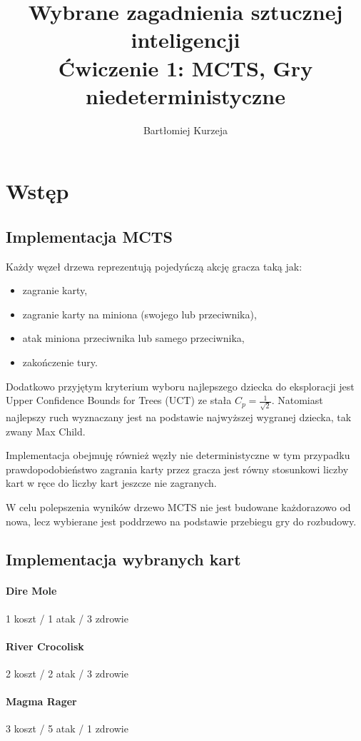 \documentclass[10pt,a4paper]{article}
\author{Bartłomiej Kurzeja}
\title{Wybrane zagadnienia sztucznej inteligencji \\ Ćwiczenie 1: MCTS, Gry niedeterministyczne}
\begin{document}
\maketitle
\section{Wstęp}
\subsection{Implementacja MCTS}
Każdy węzeł drzewa reprezentują pojedyńczą akcję gracza taką jak:
\begin{itemize}
	\item zagranie karty,
	\item zagranie karty na miniona (swojego lub przeciwnika),
	\item atak miniona przeciwnika lub samego przeciwnika,
	\item zakończenie tury. 
\end{itemize}

Dodatkowo przyjętym kryterium wyboru najlepszego dziecka do eksploracji jest Upper Confidence Bounds for Trees (UCT) ze stała $C_p = \frac{1}{\sqrt{2}}$. Natomiast najlepszy ruch wyznaczany jest na podstawie najwyższej wygranej dziecka, tak zwany Max Child.

Implementacja obejmuję również węzły nie deterministyczne w tym przypadku prawdopodobieństwo zagrania karty przez gracza jest równy stosunkowi liczby kart w ręce do liczby kart jeszcze nie zagranych.

W celu polepszenia wyników drzewo MCTS nie jest budowane każdorazowo od nowa, lecz wybierane jest poddrzewo na podstawie przebiegu gry do rozbudowy.

\subsection{Implementacja wybranych kart}
\paragraph{Dire Mole} 1 koszt / 1 atak / 3 zdrowie
\paragraph{River Crocolisk} 2 koszt / 2 atak / 3 zdrowie
\paragraph{Magma Rager} 3 koszt / 5 atak / 1 zdrowie
\end{document}
